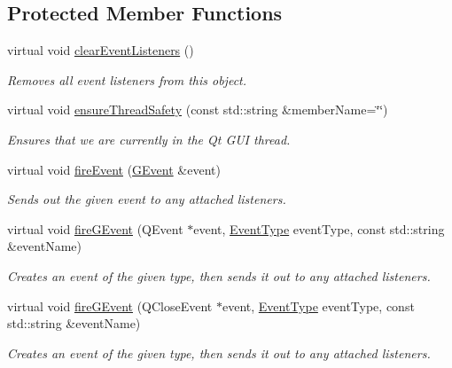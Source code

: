 \subsection*{Protected Member Functions}
\begin{DoxyCompactItemize}
\item 
virtual void \mbox{\hyperlink{classsgl_1_1GObservable_a80cfa040459ff53594adbd6a51ec8f43}{clear\+Event\+Listeners}} ()
\begin{DoxyCompactList}\small\item\em Removes all event listeners from this object. \end{DoxyCompactList}\item 
virtual void \mbox{\hyperlink{classsgl_1_1GObservable_a284f31528c0520f8e545c03ac9eeac74}{ensure\+Thread\+Safety}} (const std\+::string \&member\+Name=\char`\"{}\char`\"{})
\begin{DoxyCompactList}\small\item\em Ensures that we are currently in the Qt G\+UI thread. \end{DoxyCompactList}\item 
virtual void \mbox{\hyperlink{classsgl_1_1GObservable_a63e5e5a6227c59c928493b11aceb0f67}{fire\+Event}} (\mbox{\hyperlink{classsgl_1_1GEvent}{G\+Event}} \&event)
\begin{DoxyCompactList}\small\item\em Sends out the given event to any attached listeners. \end{DoxyCompactList}\item 
virtual void \mbox{\hyperlink{classsgl_1_1GObservable_ab3983ea07337b52020a29cc00c653d8d}{fire\+G\+Event}} (Q\+Event $\ast$event, \mbox{\hyperlink{namespacesgl_a2628ea8d12e8b2563c32f05dc7fff6fa}{Event\+Type}} event\+Type, const std\+::string \&event\+Name)
\begin{DoxyCompactList}\small\item\em Creates an event of the given type, then sends it out to any attached listeners. \end{DoxyCompactList}\item 
virtual void \mbox{\hyperlink{classsgl_1_1GObservable_a01fdf1b0e0dbd49e189fe4514e010411}{fire\+G\+Event}} (Q\+Close\+Event $\ast$event, \mbox{\hyperlink{namespacesgl_a2628ea8d12e8b2563c32f05dc7fff6fa}{Event\+Type}} event\+Type, const std\+::string \&event\+Name)
\begin{DoxyCompactList}\small\item\em Creates an event of the given type, then sends it out to any attached listeners. \end{DoxyCompactList}\item 

\end{DoxyCompactItemize}
